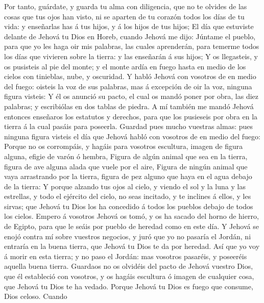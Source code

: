  Por tanto, guárdate, y guarda tu alma con diligencia, que
no te olvides de las cosas que tus ojos han visto, ni se aparten de tu
corazón todos los días de tu vida: y enseñarlas has á tus hijos, y á los
hijos de tus hijos;  El día que estuviste delante de Jehová
tu Dios en Horeb, cuando Jehová me dijo: Júntame el pueblo, para que yo
les haga oir mis palabras, las cuales aprenderán, para temerme todos los
días que vivieren sobre la tierra: y las enseñarán á sus hijos;
 Y os llegasteis, y os pusisteis al pie del monte; y el
monte ardía en fuego hasta en medio de los cielos con tinieblas, nube, y
oscuridad.  Y habló Jehová con vosotros de en medio del
fuego: oisteis la voz de sus palabras, mas á excepción de oir la voz,
ninguna figura visteis:  Y él os anunció su pacto, el cual
os mandó poner por obra, las diez palabras; y escribiólas en dos tablas
de piedra.  A mí también me mandó Jehová entonces enseñaros
los estatutos y derechos, para que los pusieseis por obra en la tierra á
la cual pasáis para poseerla.  Guardad pues mucho vuestras
almas: pues ninguna figura visteis el día que Jehová habló con vosotros
de en medio del fuego:  Porque no os corrompáis, y hagáis
para vosotros escultura, imagen de figura alguna, efigie de varón ó
hembra,  Figura de algún animal que sea en la tierra,
figura de ave alguna alada que vuele por el aire,  Figura
de ningún animal que vaya arrastrando por la tierra, figura de pez
alguno que haya en el agua debajo de la tierra:  Y porque
alzando tus ojos al cielo, y viendo el sol y la luna y las estrellas, y
todo el ejército del cielo, no seas incitado, y te inclines á ellos, y
les sirvas; que Jehová tu Dios los ha concedido á todos los pueblos
debajo de todos los cielos.  Empero á vosotros Jehová os
tomó, y os ha sacado del horno de hierro, de Egipto, para que le seáis
por pueblo de heredad como en este día.  Y Jehová se enojó
contra mí sobre vuestros negocios, y juró que yo no pasaría el Jordán,
ni entraría en la buena tierra, que Jehová tu Dios te da por heredad.
 Así que yo voy á morir en esta tierra; y no paso el
Jordán: mas vosotros pasaréis, y poseeréis aquella buena tierra.
 Guardaos no os olvidéis del pacto de Jehová vuestro Dios,
que él estableció con vosotros, y os hagáis escultura ó imagen de
cualquier cosa, que Jehová tu Dios te ha vedado.  Porque
Jehová tu Dios es fuego que consume, Dios celoso.  Cuando
